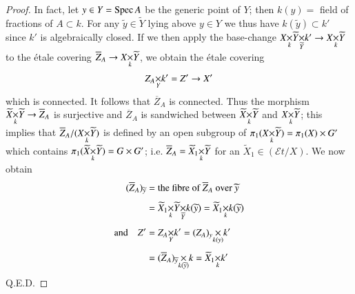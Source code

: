 \begin{proof}
In fact, let $y\in Y=\operatorname{Spec} A$ be the generic point of $Y$; then
$k(y)=$ field of fractions of $A\subset k$. For any
$\widetilde{y}\in\widetilde{Y}$ lying above $y\in Y$ we thus have
$k(\widetilde{y})\subset k'$ since $k'$ is algebraically closed. If we
then apply the base-change
$\fprod{X}{\fprod{\widetilde{Y}}{k'}{\widetilde{Y}}}{k}\to
  \fprod{X}{\widetilde{Y}}{k}$ to the \'etale covering
  $\overline{Z}_{A}\to \fprod{X}{\widetilde{Y}}{k}$, we obtain the
  \'etale covering
$$
\fprod{Z_{A}}{k'}{Y}=Z'\to X'
$$
which is connected. It follows that $\overline{Z}_{A}$ is
connected. Thus the morphism
$\fprod{\widetilde{X}}{\widetilde{Y}}{k}\to \overline{Z}_{A}$ is
surjective and $\overline{Z}_{A}$ is sandwiched between
$\fprod{\widetilde{X}}{\widetilde{Y}}{k}$ and
$\fprod{X}{\widetilde{Y}}{k}$; this implies that
$\overline{Z}_{A}/(\fprod{X}{\widetilde{Y}}{k})$ is defined by an open subgroup
of $\pi_{1}(\fprod{X}{\widetilde{Y}}{k})=\pi_{1}(X)\times G'$ which
contains $\pi_{1}(\fprod{\widetilde{X}}{\widetilde{Y}}{k})=G\times
G'$;
i.e. $\overline{Z}_{A}=\fprod{\widetilde{X}_{1}}{\widetilde{Y}}{k}$
for an $\widetilde{X}_{1}\in (\mathscr{E}t/X)$. We now obtain
\begin{align*}
(\overline{Z}_{A})_{\widetilde{y}} &= \text{the fibre of }
  \overline{Z}_{A}\text{ over } \widetilde{y}\\[4pt]
&=
  \fprod{\widetilde{X}_{1}}{\fprod{\widetilde{Y}}{k(\widetilde{y})}{\widetilde{Y}}}{k}=\fprod{\widetilde{X}_{1}}{k(\widetilde{y})}{k}\\[4pt] 
\text{and}\quad Z' &=
\fprod{Z_{A}}{k'}{Y}=\fprod{(Z_{A})_{y}}{k'}{k(y)}\\[4pt] 
&=
\fprod{(\overline{Z}_{A})_{\widetilde{y}}}{k}{k(\widetilde{y})}=\fprod{\widetilde{X}_{1}}{k'}{k} 
\end{align*}
\hfill Q.E.D.
\end{proof}



